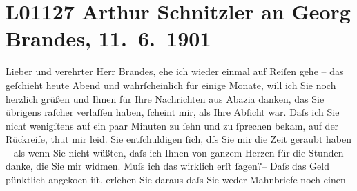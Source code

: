 

\section[Arthur Schnitzler an Georg Brandes, 11. 6. 1901]{L01127 Arthur Schnitzler an Georg Brandes, 11. 6. 1901}
\nopagebreak{}
\rehead{ }\normalsize\beginnumbering{}
\toendnotes[C]{\smallbreak\pagebreak[2]}
\toendnotes[C]{\smallbreak}
\toendnotes[C]{\smallbreak}
\pstart{}{\pb}Lieber und verehrter Herr Brandes,\pend\vspace{0.5em}
\pstart
           ehe ich wieder einmal auf Reiſen gehe – das geſchieht heute Abend und wahrſcheinlich
               für einige Monate, will ich Sie noch herzlich grüßen und Ihnen für Ihre Nachrichten
               aus Abazia danken, das Sie übrigens raſcher
               verlaſſen haben,{ }ſcheint mir, als Ihre Abſicht war. Daſs ich Sie {\pb}nicht wenigſtens auf ein paar Minuten zu{ }ſehn und
               zu{ }ſprechen bekam, auf der Rückreiſe, thut mir leid. Sie entſchuldigen{ }ſich, dſs Sie
               mir die Zeit geraubt haben – als wenn Sie nicht wüßten, daſs ich Ihnen von ganzem
               Herzen für die Stunden danke, die Sie mir widmen. Muſs ich das wirklich erſt{ }ſagen?–
               Daſs das Geld pünktlich angeko{\geminationm}en iſt, erſehen Sie
               daraus {\pb}daſs Sie weder Mahnbriefe noch einen
